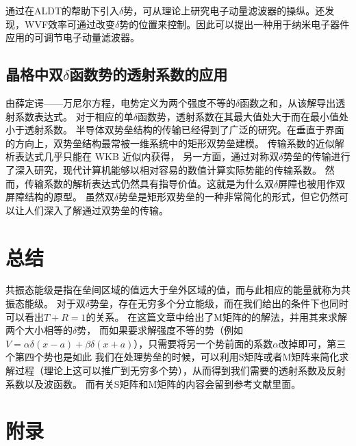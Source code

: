 \documentclass[12pt, a4paper, oneside]{ctexart}
\begin{document}
\begin{spacing}{2.0}
通过在ALDT的帮助下引入$\delta$势，可从理论上研究电子动量滤波器的操纵。还发现，WVF效率可通过改变$\delta$势的位置来控制。因此可以提出一种用于纳米电子器件应用的可调节电子动量滤波器。
	
\subsection{晶格中双$\delta$函数势的透射系数的应用}
\cite{YANETKA1999371}由薛定谔——万尼尔方程，电势定义为两个强度不等的$\delta$函数之和，从该解导出透射系数表达式。  对于相应的单$\delta$函数势，透射系数在其最大值处大于而在最小值处小于透射系数。
半导体双势垒结构的传输已经得到了广泛的研究。在垂直于界面的方向上，双势垒结构最常被一维系统中的矩形双势垒建模。
传输系数的近似解析表达式几乎只能在 WKB 近似内获得，
另一方面，通过对称双$\delta$势垒的传输进行了深入研究，现代计算机能够以相对容易的数值计算实际势能的传输系数。
然而，传输系数的解析表达式仍然具有指导价值。这就是为什么双$\delta$屏障也被用作双屏障结构的原型。
虽然双$\delta$势垒是矩形双势垒的一种非常简化的形式，但它仍然可以让人们深入了解通过双势垒的传输。

\section{总结}
共振态能级是指在垒间区域的值远大于垒外区域的值，而与此相应的能量就称为共振态能级。
对于双$\delta$势垒，存在无穷多个分立能级，而在我们给出的条件下也同时可以看出$T+R=1$的关系。
在这篇文章中给出了M矩阵的的解法，并用其来求解两个大小相等的$\delta$势，
而如果要求解强度不等的势（例如$V=\alpha \delta(x-a)+\beta \delta(x+a)$），只需要将另一个势前面的系数$\alpha$改掉即可，第三个第四个势也是如此
我们在处理势垒的时候，可以利用S矩阵或者M矩阵来简化求解过程（理论上这可以推广到无穷多个势），从而得到我们需要的透射系数及反射系数以及波函数。
而有关S矩阵\cite{enwiki:1074717524}和M矩阵\cite{RN03}的内容会留到参考文献里面。
\newpage
\section{附录}

\end{spacing}
\end{document}
